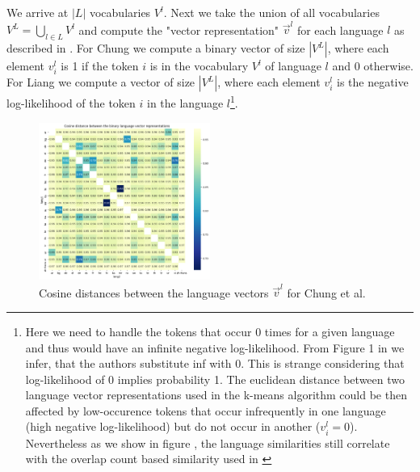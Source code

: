 We arrive at $|L|$ vocabularies $V^l$. Next we take the union of all vocabularies $V^L = \bigcup_{l \in L} V^l$ and compute the "vector representation" $\vec{v}^l$ for each language $l$ as described in . For Chung we compute a binary vector of size $|V^L|$, where each element $v^l_i$ is 1 if the token $i$ is in the vocabulary $V^l$ of language $l$ and 0 otherwise. For Liang we compute a vector of size $|V^L|$, where each element $v^l_i$ is the negative log-likelihood of the token $i$ in the language $l$\footnote{Here we need to handle the tokens that occur 0 times for a given language and thus would have an infinite negative log-likelihood. From Figure 1 in \cite{liang_xlm-v_2023} we infer, that the authors substitute inf with 0. This is strange considering that log-likelihood of 0 implies probability 1. The euclidean distance between two language vector representations used in the k-means algorithm could be then affected by low-occurence tokens that occur infrequently in one language (high negative log-likelihood) but do not occur in another ($v^l_i = 0$). Nevertheless as we show in figure , the language similarities still correlate with the overlap count based similarity used in \cite{chung_improving_2020}}.



\begin{figure}[h]
    \centering
    \includegraphics[width=0.5\textwidth]{img/chung_distances.png}
    \caption{Cosine distances between the language vectors $\vec{v}^l$ for Chung et al.}
    \label{fig:chung_distances}
\end{figure}

